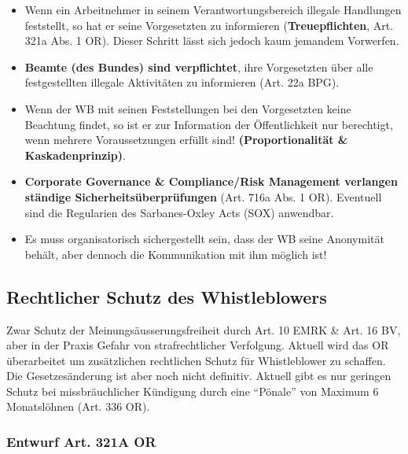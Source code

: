 \begin{itemize}
\tightlist
	\item Wenn ein Arbeitnehmer in seinem Verantwortungsbereich illegale
	Handlungen feststellt, so hat er seine Vorgesetzten zu informieren
	(\textbf{Treuepflichten}, Art. 321a Abs. 1 OR). Dieser Schritt lässt
	sich jedoch kaum jemandem Vorwerfen.
	\item \textbf{Beamte (des Bundes) sind verpflichtet}, ihre Vorgesetzten über
	alle festgestellten illegale Aktivitäten zu informieren (Art. 22a
	BPG).
	\item Wenn der WB mit seinen Feststellungen bei den Vorgesetzten keine
	Beachtung findet, so ist er zur Information der Öffentlichkeit nur
	berechtigt, wenn mehrere Voraussetzungen erfüllt sind!
	\textbf{(Proportionalität \& Kaskadenprinzip)}.
	\item \textbf{Corporate Governance \& Compliance/Risk Management verlangen
	ständige Sicherheitsüberprüfungen} (Art. 716a Abs. 1 OR). Eventuell sind die
	Regularien des Sarbanes-Oxley Acts (SOX) anwendbar.
	\item Es muss organisatorisch sichergestellt sein, dass der WB seine
	Anonymität behält, aber dennoch die Kommunikation mit ihm möglich ist!
\end{itemize}

\subsection{Rechtlicher Schutz des Whistleblowers}
\label{sec:IW-Schutz}
Zwar Schutz der Meinungsäusserungsfreiheit durch Art. 10 EMRK \& Art. 16
BV, aber in der Praxis Gefahr von strafrechtlicher Verfolgung. Aktuell wird
das OR überarbeitet um zusätzlichen rechtlichen Schutz für Whistleblower zu
schaffen. Die Gesetzesänderung ist aber noch nicht definitiv. Aktuell gibt
es nur geringen Schutz bei missbräuchlicher Kündigung durch eine ``Pönale'' von
Maximum 6 Monatslöhnen (Art. 336 OR).

\subsubsection{Entwurf Art. 321A OR}

